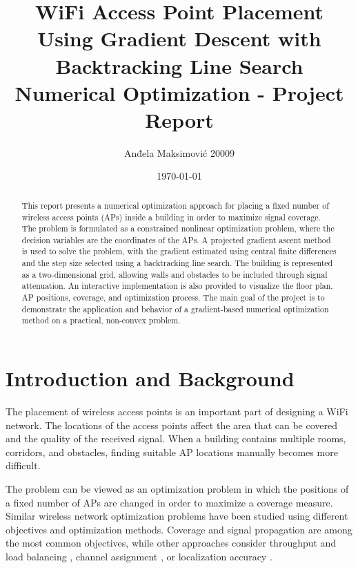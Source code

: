 \documentclass[11pt]{article}
\title{
    \textbf{\LARGE WiFi Access Point Placement}\\
    \textbf{\LARGE Using Gradient Descent with Backtracking Line Search}\\[0.2cm]
    \large Numerical Optimization - Project Report
}
\author{
    \large Anđela Maksimović 20009
}
\date{\today}
\begin{document}
\maketitle

\begin{abstract}
This report presents a numerical optimization approach for placing a
fixed number of wireless access points (APs) inside a building in order
to maximize signal coverage. The problem is formulated as a constrained
nonlinear optimization problem, where the decision variables are the
coordinates of the APs. A projected gradient ascent method is used to
solve the problem, with the gradient estimated using central finite
differences and the step size selected using a backtracking line
search. The building is represented as a two-dimensional grid, allowing
walls and obstacles to be included through signal attenuation. An
interactive implementation is also provided to visualize the floor
plan, AP positions, coverage, and optimization process. The main goal
of the project is to demonstrate the application and behavior of a
gradient-based numerical optimization method on a practical,
non-convex problem.
\end{abstract}

\tableofcontents

\section{Introduction and Background}

The placement of wireless access points is an important part of
designing a WiFi network. The locations of the access points affect the
area that can be covered and the quality of the received signal. When a
building contains multiple rooms, corridors, and obstacles, finding
suitable AP locations manually becomes more difficult.

The problem can be viewed as an optimization problem in which the
positions of a fixed number of APs are changed in order to maximize a
coverage measure. Similar wireless network optimization problems have
been studied using different objectives and optimization methods.
Coverage and signal propagation are among the most common objectives,
while other approaches consider throughput and load balancing
\cite{mcgibney2007user}, channel assignment
\cite{lee2002optimization}, or localization accuracy
\cite{battiti2003optimal}.
\end{document}
